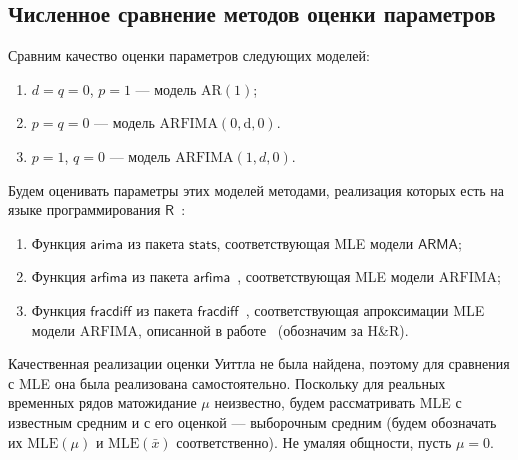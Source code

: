 \documentclass[specialist,
substylefile = spbu_report.rtx,
subf,href,colorlinks=true, 12pt]{disser}
\theoremstyle{definition}
\begin{document}
\subsection{Численное сравнение методов оценки параметров}
Сравним качество оценки параметров следующих моделей:
\begin{enumerate}
	\item $d=q=0$, $p=1$ --- модель $\mathrm{AR}(1)$;
	\item $p=q=0$ --- модель $\mathrm{ARFIMA(0, d, 0)}$.
	\item $p=1$, $q=0$ --- модель $\mathrm{ARFIMA}(1, d, 0)$.
\end{enumerate}
Будем оценивать параметры этих моделей методами, реализация которых есть на языке программирования $\mathsf{R}$~\cite{R}:
\begin{enumerate}
	\item Функция $\mathsf{arima}$ из пакета $\mathsf{stats}$, соответствующая MLE модели $\mathsf{ARMA}$;
	\item Функция $\mathsf{arfima}$ из пакета $\mathsf{arfima}$~\cite{Veenstra2012}, соответствующая MLE модели $\mathrm{ARFIMA}$;
	\item Функция $\mathsf{fracdiff}$ из пакета $\mathsf{fracdiff}$~\cite{Maechler1999}, соответствующая апроксимации MLE модели $\mathrm{ARFIMA}$, описанной в работе~\cite{Haslett1989} (обозначим за H\&R).
\end{enumerate}
Качественная реализации оценки Уиттла не была найдена, поэтому для сравнения с MLE она была реализована самостоятельно. Поскольку для реальных временных рядов матожидание $\mu$ неизвестно, будем рассматривать MLE с известным средним и с его оценкой --- выборочным средним (будем обозначать их $\mathrm{MLE}(\mu)$ и $\mathrm{MLE}(\bar x)$ соответственно). Не умаляя общности, пусть $\mu=0$.
\end{document}
